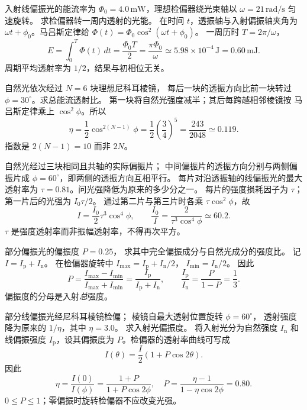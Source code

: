 入射线偏振光的能流率为
$\Phi_0=4.0\,\mathrm{mW}$，理想检偏器绕光束轴以
$\omega=21\,\mathrm{rad/s}$ 匀速旋转。
求检偏器转一周内透射的光能。
\exsolution
在时间 $t$，透振轴与入射偏振轴夹角为
$\omega t+\phi_0$。马吕斯定律给
$\Phi(t)=\Phi_0\cos^2(\omega t+\phi_0)$。
一周历时 $T=2\pi/\omega$，
\[
 E=\int_0^T\Phi(t)\,dt
 =\frac{\Phi_0 T}{2}
 =\boxed{\frac{\pi\Phi_0}{\omega}
 \simeq 5.98\times10^{-4}\,\mathrm{J}=0.60\,\mathrm{mJ}}.
\]
\excheck 周期平均透射率为 $1/2$，结果与初相位无关。

自然光依次经过 $N=6$ 块理想尼科耳棱镜，
每后一块的透振方向比前一块转过
$\phi=30^\circ$。求总能流透射比。
\exsolution
第一块将自然光强度减半；其后每跨越相邻棱镜按
马吕斯定律乘上 $\cos^2\phi$。所以
\[
 \boxed{\eta=\frac12\cos^{2(N-1)}\phi
 =\frac12\left(\frac34\right)^5
 =\frac{243}{2048}\simeq0.119}.
\]
\excheck 指数是 $2(N-1)=10$ 而非 $2N$。

自然光经过三块相同且共轴的实际偏振片；
中间偏振片的透振方向分别与两侧偏振片成
$\phi=60^\circ$，即两侧的透振方向互相平行。
每片对沿透振轴的线偏振光的最大透射率为
$\tau=0.81$。问光强降低为原来的多少分之一。
\exsolution
每片的强度损耗因子为 $\tau$；
第一片后的光强为 $I_0\tau/2$。
通过第二片与第三片时各乘 $\tau\cos^2\phi$，故
\[
 I=\frac{I_0}{2}\tau^3\cos^4\phi,\qquad
 \boxed{\frac{I_0}{I}=\frac{2}{\tau^3\cos^4\phi}
 \simeq60.2}.
\]
\excheck $\tau$ 是强度透射率而非振幅透射率，不得再次平方。

部分偏振光的偏振度 $P=0.25$，
求其中完全偏振成分与自然光成分的强度比。
\exsolution
记 $I=I_{\mathrm p}+I_{\mathrm n}$。
在检偏器旋转中
$I_{\max}=I_{\mathrm p}+I_{\mathrm n}/2$，
$I_{\min}=I_{\mathrm n}/2$。
因此
\[
 P=\frac{I_{\max}-I_{\min}}{I_{\max}+I_{\min}}
 =\frac{I_{\mathrm p}}{I_{\mathrm p}+I_{\mathrm n}},
 \qquad
 \boxed{\frac{I_{\mathrm p}}{I_{\mathrm n}}=
 \frac{P}{1-P}=\frac13}.
\]
\excheck 偏振度的分母是入射\emph{总}强度。

部分线偏振光经尼科耳棱镜检偏；
棱镜自最大透射位置旋转 $\phi=60^\circ$，
透射强度降为原来的 $1/\eta$，其中 $\eta=3.0$。
求入射光偏振度。
\exsolution
将入射光分为自然强度 $I_{\mathrm n}$ 和线偏振强度
$I_{\mathrm p}$，设其偏振度为 $P$。检偏器的透射率曲线可写成
\[
 I(\theta)=\frac I2(1+P\cos2\theta).
\]
因此
\[
 \eta=\frac{I(0)}{I(\phi)}
 =\frac{1+P}{1+P\cos2\phi},\quad
 \boxed{P=\frac{\eta-1}{1-\eta\cos2\phi}=0.80}.
\]
\excheck $0\le P\le1$；零偏振时旋转检偏器不应改变光强。

